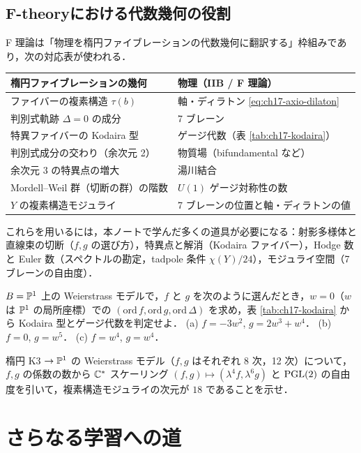 \subsection{F-theoryにおける代数幾何の役割}

F 理論は「物理を楕円ファイブレーションの代数幾何に翻訳する」枠組みであり，次の対応表が使われる．

\begin{center}
\renewcommand{\arraystretch}{1.2}
\begin{tabular}{ll}
\hline
楕円ファイブレーションの幾何 & 物理（IIB / F 理論）\\
\hline
ファイバーの複素構造 $\tau(b)$ & 軸・ディラトン \eqref{eq:ch17-axio-dilaton}\\
判別式軌跡 $\Delta=0$ の成分 & 7 ブレーン\\
特異ファイバーの Kodaira 型 & ゲージ代数（表 \ref{tab:ch17-kodaira}）\\
判別式成分の交わり（余次元 2）& 物質場（bifundamental など）\\
余次元 3 の特異点の増大 & 湯川結合\\
Mordell--Weil 群（切断の群）の階数 & $U(1)$ ゲージ対称性の数\\
$Y$ の複素構造モジュライ & 7 ブレーンの位置と軸・ディラトンの値\\
\hline
\end{tabular}
\end{center}

これらを用いるには，本ノートで学んだ多くの道具が必要になる：射影多様体と直線束の切断（$f,g$ の選び方），特異点と解消（Kodaira ファイバー），Hodge 数と Euler 数（スペクトルの勘定，tadpole 条件 $\chi(Y)/24$），モジュライ空間（7 ブレーンの自由度）．

$B=\mathbb{P}^1$ 上の Weierstrass モデルで，$f$ と $g$ を次のように選んだとき，$w=0$（$w$ は $\mathbb{P}^1$ の局所座標）での $(\mathrm{ord}\,f,\mathrm{ord}\,g,\mathrm{ord}\,\Delta)$ を求め，表 \ref{tab:ch17-kodaira} から Kodaira 型とゲージ代数を判定せよ．
(a) $f=-3w^2$, $g=2w^3+w^4$．
(b) $f=0$, $g=w^5$．
(c) $f=w^4$, $g=w^4$．

楕円 K3 $\to\mathbb{P}^1$ の Weierstrass モデル（$f,g$ はそれぞれ 8 次，12 次）について，$f,g$ の係数の数から $\mathbb{C}^*$ スケーリング $(f,g)\mapsto(\lambda^4f,\lambda^6g)$ と $\operatorname{PGL}(2)$ の自由度を引いて，複素構造モジュライの次元が $18$ であることを示せ．

\section{さらなる学習への道}

